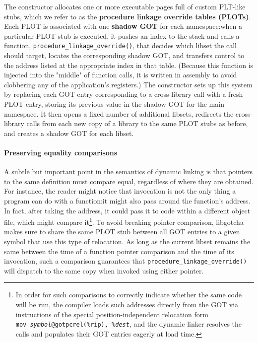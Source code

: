 The constructor allocates one or more executable pages full of custom PLT-like
stubs, which we refer to as the \textbf{procedure linkage override tables (PLOTs)}.
Each PLOT is associated with one \textbf{shadow GOT} for each namespace:\@ when a
particular PLOT stub is executed, it pushes an index to the stack and calls a
function, \texttt{procedure\_linkage\_override()}, that decides which libset the call
should target, locates the corresponding shadow GOT, and transfers control to the
address listed at the appropriate index in that table.  (Because this function
is injected into the "middle" of function calls, it is written in assembly to avoid
clobbering any of the application's registers.)  The constructor sets up this system
by replacing each GOT entry corresponding to a cross-library call with a fresh PLOT
entry, storing its previous value in the shadow GOT for the main namespace.  It then
opens a fixed number of additional libsets, redirects the cross-library calls from
each new copy of a library to the same PLOT stubs as before, and creates a shadow GOT
for each libset.



\paragraph{Preserving equality comparisons}

A subtle but important point in the semantics of dynamic linking is that pointers to
the same definition must compare equal, regardless of where they are obtained.  For
instance,
the reader might notice that invocation is not the only thing a program can do with a
function:\@ it might also pass around the function's address.  In fact, after taking
the address, it could pass it to code within a different object file, which might
compare it\footnote{In order for such comparisons to correctly indicate whether the
same code will be run, the compiler loads such addresses directly from the GOT via
instructions of the special position-independent relocation form
\texttt{mov~\textit{symbol}@gotpcrel(\%rip),~\%\textit{dest}}, and the dynamic linker
resolves the calls and populates their GOT entries eagerly at load time.}.  To avoid
breaking pointer comparison, libgotcha makes sure to share the same PLOT
stub between all GOT entries to a given symbol that use this type of
relocation.  As long as the current libset remains the same between the time of a
function pointer comparison and the time of its invocation, such a comparison
guarantees that \texttt{procedure\_linkage\_override()} will dispatch to the same
copy when invoked using either pointer.

